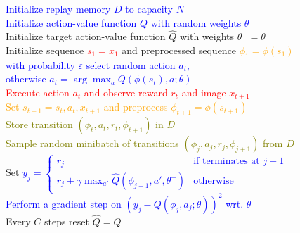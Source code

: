 \documentclass{standalone}
\begin{document}
\pagestyle{empty}
\begin{algorithm}[H]
  \textcolor{blue}{Initialize replay memory $D$ to capacity $N$}\\
  \textcolor{blue}{Initialize action-value function $Q$ with random weights $\theta$}\\
  \textcolor{Cerulean}{Initialize target action-value function $\hat{Q}$ with weights $\theta^{-}=\theta$} \\
 {
  Initialize sequence \textcolor{red}{$s_1 = {x_1}$} and preprocessed sequence \textcolor{orange}{$\phi_1=\phi(s_1)$}\\
   {
  \textcolor{blue}{with probability $\varepsilon$ select random action $a_t$, \\
  	otherwise $a_t = \arg\max_{a} Q(\phi(s_t), a; \theta)$} \\
  \textcolor{red}{Execute action $a_t$ and observe reward $r_t$ and image $x_{t+1}$}\\
  \textcolor{orange}{Set $s_{t+1} = s_t, a_t, x_{t+1}$ and preprocess $\phi_{t+1} = \phi(s_{t+1})$}\\
  \textcolor{olive}{Store transition $(\phi_t,a_t ,r_t, \phi_{t+1})$ in $D$\\
  Sample random minibatch of transitions $(\phi_j,a_j ,r_j, \phi_{j+1})$ from $D$}\\
  Set \textcolor{blue}{$y_j = \begin{cases}
      r_j & \text{if terminates at } j+1\\
      r_j + \gamma \max_{a'} \hat{Q}(\phi_{j+1}, a', \theta^{-}) & \text{otherwise}
    \end{cases} $} \\
  \textcolor{blue}{Perform a gradient step on $(y_j - Q(\phi_j, a_j; \theta))^2$ wrt. $\theta$}\\
  \textcolor{Cerulean}{Every $C$ steps reset $\hat{Q} = Q$}
  }
}
\end{algorithm}
\end{document}
